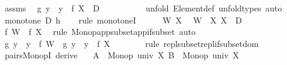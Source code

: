 \begin{isabellebody}
\ assms\ \isamarkupfalse%
\ {\isachardoublequoteopen}{\isacharbraceleft}{\kern0pt}g\ y\ {\isacharbar}{\kern0pt}\ y\ {\isasymin}\ f\ X{\isacharbraceright}{\kern0pt}\ {\isasymsubseteq}\ D{\isachardoublequoteclose}\isanewline
\ \ \ \ \isanewline
\ \ \ \ \isamarkupfalse%
\ {\isacharparenleft}{\kern0pt}unfold\ Element{\isacharunderscore}{\kern0pt}def{\isacharparenright}{\kern0pt}\ {\isacharparenleft}{\kern0pt}unfold{\isacharunderscore}{\kern0pt}types{\isacharcomma}{\kern0pt}\ auto{\isacharparenright}{\kern0pt}\isanewline
{}\isamarkupfalse%
\isanewline
\ \ \isamarkupfalse%
\ {\isachardoublequoteopen}monotone\ D\ {\isacharquery}{\kern0pt}h{\isachardoublequoteclose}\isanewline
\ \ \isamarkupfalse%
\ {\isacharparenleft}{\kern0pt}rule\ monotoneI{\isacharparenright}{\kern0pt}\isanewline
\ \ \ \ \isamarkupfalse%
\ W\ X\ \isamarkupfalse%
\ {\isachardoublequoteopen}W\ {\isasymsubseteq}\ X{\isachardoublequoteclose}\ {\isachardoublequoteopen}X\ {\isasymsubseteq}\ D{\isachardoublequoteclose}\isanewline
\ \ \ \ \isamarkupfalse%
\ {\isachardoublequoteopen}f\ W\ {\isasymsubseteq}\ f\ X{\isachardoublequoteclose}\ \isamarkupfalse%
\ {\isacharparenleft}{\kern0pt}rule\ Monop{\isacharunderscore}{\kern0pt}app{\isacharunderscore}{\kern0pt}subset{\isacharunderscore}{\kern0pt}app{\isacharunderscore}{\kern0pt}if{\isacharunderscore}{\kern0pt}subset{\isacharparenright}{\kern0pt}\ auto\isanewline
\ \ \ \ \isamarkupfalse%
\ \isamarkupfalse%
\ {\isachardoublequoteopen}{\isacharbraceleft}{\kern0pt}g\ y\ {\isacharbar}{\kern0pt}\ y\ {\isasymin}\ f\ W{\isacharbraceright}{\kern0pt}\ {\isasymsubseteq}\ {\isacharbraceleft}{\kern0pt}g\ y\ {\isacharbar}{\kern0pt}\ y\ {\isasymin}\ f\ X{\isacharbraceright}{\kern0pt}{\isachardoublequoteclose}\isanewline
\ \ \ \ \ \ \isamarkupfalse%
\ {\isacharparenleft}{\kern0pt}rule\ repl{\isacharunderscore}{\kern0pt}subset{\isacharunderscore}{\kern0pt}repl{\isacharunderscore}{\kern0pt}if{\isacharunderscore}{\kern0pt}subset{\isacharunderscore}{\kern0pt}dom{\isacharparenright}{\kern0pt}\isanewline
\ \ \isamarkupfalse%
\isanewline
{}\isamarkupfalse%
%
\endisatagproof
{\isafoldproof}%
%
\isadelimproof
\isanewline
%
\endisadelimproof
\isanewline
{}\isamarkupfalse%
\ pairs{\isacharunderscore}{\kern0pt}MonopI\ {\isacharbrackleft}{\kern0pt}derive{\isacharbrackright}{\kern0pt}{\isacharcolon}{\kern0pt}\isanewline
\ \ \ {\isachardoublequoteopen}A\ {\isacharcolon}{\kern0pt}\ Monop\ {\isacharparenleft}{\kern0pt}univ\ X{\isacharparenright}{\kern0pt}{\isachardoublequoteclose}\ {\isachardoublequoteopen}B\ {\isacharcolon}{\kern0pt}\ Monop\ {\isacharparenleft}{\kern0pt}univ\ X{\isacharparenright}{\kern0pt}{\isachardoublequoteclose}\isanewline

\end{isabellebody}
